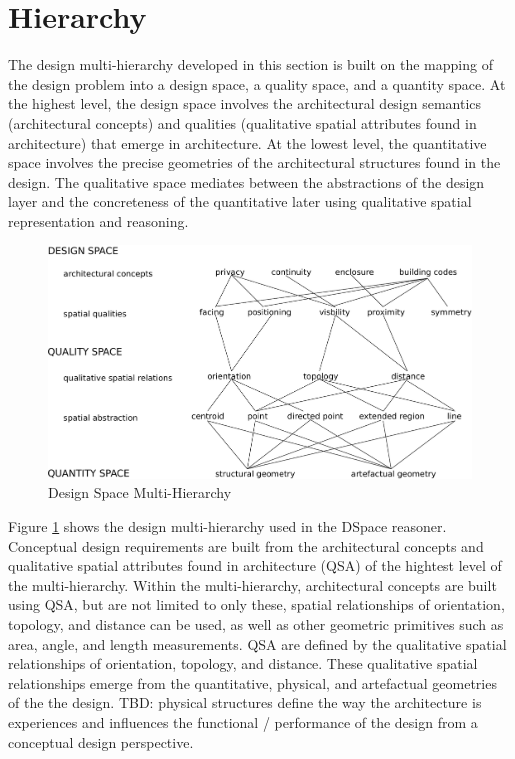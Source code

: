 \documentclass[12pt]{ucthesis}
\begin{document}
\section{Hierarchy}
The design multi-hierarchy developed in this section is built on the mapping of the design problem into a design space, a quality space, and a quantity space. At the highest level, the design space involves the architectural design semantics (architectural concepts) and qualities (qualitative spatial attributes found in architecture) that emerge in architecture. At the lowest level, the quantitative space involves the precise geometries of the architectural structures found in the design. The qualitative space mediates between the abstractions of the design layer and the concreteness of the quantitative later using qualitative spatial representation and reasoning.
 
\begin{figure}[H]
\centering
\includegraphics[width=140mm]{hierarchy2}
\caption{Design Space Multi-Hierarchy}
\label{hierarchy}
\end{figure}

Figure \ref{hierarchy} shows the design multi-hierarchy used in the DSpace reasoner. Conceptual design requirements are built from the architectural concepts and qualitative spatial attributes found in architecture (QSA) of the hightest level of the multi-hierarchy. Within the multi-hierarchy, architectural concepts are built using QSA, but are not limited to only these, spatial relationships of orientation, topology, and distance can be used, as well as other geometric primitives such as area, angle, and length measurements. QSA are defined by the qualitative spatial relationships of orientation, topology, and distance. These qualitative spatial relationships emerge from the quantitative, physical, and artefactual geometries of the the design. TBD: physical structures define the way the architecture is experiences and influences the functional / performance of the design from a conceptual design perspective.
\end{document}
